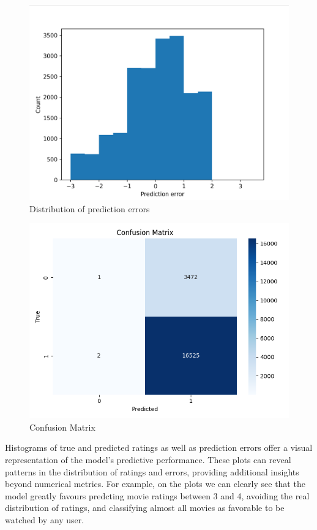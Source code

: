 \documentclass[]{article}
\begin{document}
	\begin{figure}[H]
		\includegraphics[scale=1]{figures/fig_2.png}
		\caption{Distribution of prediction errors}
	\end{figure} 
	
	\begin{figure}[H]
		\includegraphics[scale=1]{figures/fig_3.png}
		\caption{Confusion Matrix}
	\end{figure} 
	
	Histograms of true and predicted ratings as well as prediction errors offer a visual representation of the model's predictive performance.
	These plots can reveal patterns in the distribution of ratings and errors, providing additional insights beyond numerical metrics. For example, on the plots we can clearly see that the model greatly favours predcting movie ratings between 3 and 4, avoiding the real distribution of ratings, and classifying almost all movies as favorable to be watched by any user.\\
	
\end{document}
